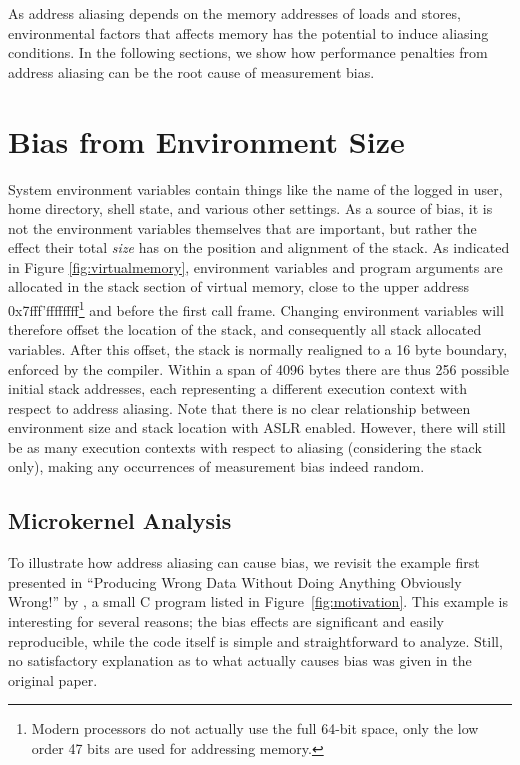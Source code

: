 \documentclass[prodmode,acmtaco]{acmsmall}
\begin{document}
As address aliasing depends on the memory addresses of loads and stores, environmental factors that affects memory has the potential to induce aliasing conditions.
In the following sections, we show how performance penalties from address aliasing can be the root cause of measurement bias.


\section{Bias from Environment Size}
\label{sec:environment}
System environment variables contain things like the name of the logged in user, home directory, shell state, and various other settings.
As a source of bias, it is not the environment variables themselves that are important, but rather the effect their total \emph{size} has on the position and alignment of the stack.
As indicated in Figure \ref{fig:virtualmemory}, environment variables and program arguments are allocated in the stack section of virtual memory, close to the upper address 0x7fff'ffffffff\footnote{Modern processors do not actually use the full 64-bit space, only the low order 47 bits are used for addressing memory.} and before the first call frame.
Changing environment variables will therefore offset the location of the stack, and consequently all stack allocated variables.
After this offset, the stack is normally realigned to a 16 byte boundary, enforced by the compiler.
Within a span of 4096 bytes there are thus 256 possible initial stack addresses, each representing a different execution context with respect to address aliasing. 
Note that there is no clear relationship between environment size and stack location with ASLR enabled.
However, there will still be as many execution contexts with respect to aliasing (considering the stack only), making any occurrences of measurement bias indeed random.

\subsection{Microkernel Analysis}
\label{sec:microkernel}
To illustrate how address aliasing can cause bias, we revisit the example first presented in ``Producing Wrong Data Without Doing Anything Obviously Wrong!'' by , a small C program listed in Figure~\ref{fig:motivation}. 
This example is interesting for several reasons; the bias effects are significant and easily reproducible, while the code itself is simple and straightforward to analyze.
Still, no satisfactory explanation as to what actually causes bias was given in the original paper.
\end{document}

